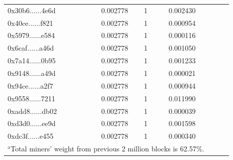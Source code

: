 \documentclass[conference]{IEEEtran}
\begin{document}
\begin{table}[htbp]
\begin{center}
\begin{tabular}{lclclcl}
0x30b6......4e6d & 0.002778 & 1      & 0.002430       \\
0x40ce......f821 & 0.002778 & 1      & 0.000954       \\
0x5979......e584 & 0.002778 & 1      & 0.000116       \\
0x6caf......a46d & 0.002778 & 1      & 0.001050       \\
0x7a14......0b95 & 0.002778 & 1      & 0.001233       \\
0x9148......a49d & 0.002778 & 1      & 0.000021       \\
0x94ce......a2f7 & 0.002778 & 1      & 0.000944       \\
0x9558......7211 & 0.002778 & 1      & 0.011990       \\
0xadd8......db02 & 0.002778 & 1      & 0.000039       \\
0xd3d0......ee9d & 0.002778 & 1      & 0.001598       \\
0xdc3f......e455 & 0.002778 & 1      & 0.000340       \\
\hline
\multicolumn{4}{l}{$^{\mathrm{a}}$Total miners' weight from previous 2 million blocks is 62.57\%.}
\end{tabular}
\end{center}
\end{table}
\end{document}
